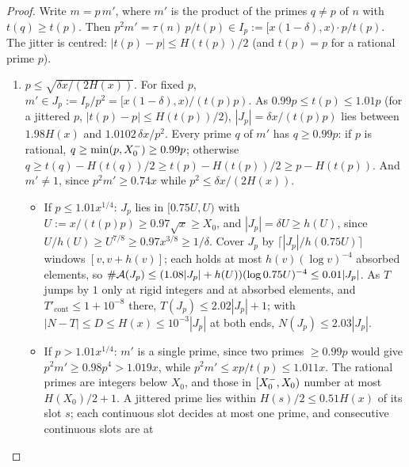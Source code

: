 \begin{proof}
Write $m=p\,m'$, where $m'$ is the product of the primes $q\ne p$ of $n$ with $t(q)\ge t(p)$. Then
$p^2m'=\tau(n)\,p/t(p)\in I_p:=[x(1-\delta),x)\cdot p/t(p)$. The jitter is centred: $|t(p)-p|\le H(t(p))/2$ (and $t(p)=p$ for a
rational prime $p$).
\begin{enumerate}[label=(\roman*)]
\item $p\le\sqrt{\delta x/(2H(x))}$. For fixed $p$, $m'\in J_p:=I_p/p^2=[x(1-\delta),x)/(t(p)p)$. As $0.99p\le t(p)\le1.01p$ (for
  a jittered $p$, $|t(p)-p|\le H(t(p))/2$), $|J_p|=\delta x/(t(p)p)$ lies between $1.98H(x)$ and $1.0102\,\delta x/p^2$. Every
  prime $q$ of $m'$ has $q\ge0.99p$: if $p$ is rational, $q\ge\min(p,X_0^{-})\ge0.99p$; otherwise $q\ge t(q)-H(t(q))/2\ge t(p)-H(t(p))/2\ge p-H(t(p))$.
  And $m'\ne1$, since $p^2m'\ge0.74x$ while $p^2\le\delta x/(2H(x))$.
  \begin{itemize}
  \item If $p\le1.01x^{1/4}$: $J_p$ lies in $[0.75U,U)$ with $U:=x/(t(p)p)\ge0.97\sqrt x\ge X_0$, and $|J_p|=\delta U\ge h(U)$,
    since $U/h(U)\ge U^{7/8}\ge0.97x^{3/8}\ge1/\delta$. Cover $J_p$ by $\lceil|J_p|/h(0.75U)\rceil$ windows $[v,v+h(v)]$;
    each holds at most $h(v)(\log v)^{-4}$ absorbed elements, so $\#\mathcal{A}(J_p)\le(1.08|J_p|+h(U))(\log0.75U)^{-4}\le0.01|J_p|$. As $T$
    jumps by $1$ only at rigid integers and at absorbed elements, and $T'_{\mathrm{cont}}\le1+10^{-8}$ there,
    $T(J_p)\le2.02|J_p|+1$; with $|N-T|\le D\le H(x)\le10^{-3}|J_p|$ at both ends, $N(J_p)\le2.03|J_p|$.
  \item If $p>1.01x^{1/4}$: $m'$ is a single prime, since two primes $\ge0.99p$ would give $p^2m'\ge0.98p^4>1.019x$, while $p^2m'\le xp/t(p)\le1.011x$. The
    rational primes are integers below $X_0$, and those in $[X_0^{-},X_0)$ number at most $H(X_0)/2+1$. A jittered prime lies within
    $H(s)/2\le0.51H(x)$ of its slot $s$; each continuous slot decides at most one prime, and consecutive continuous slots are at

\end{itemize}
\end{enumerate}
\end{proof}
